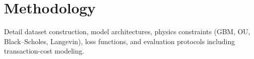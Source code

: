 \chapter{Methodology}

Detail dataset construction, model architectures, physics constraints (GBM, OU, Black--Scholes, Langevin), loss functions, and evaluation protocols including transaction-cost modeling.
